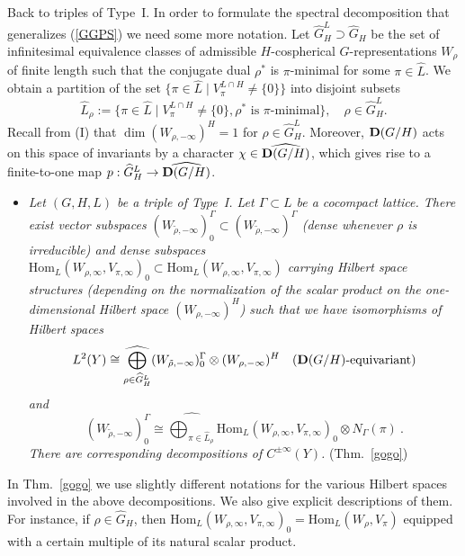 \documentclass[10]{amsart}
\theoremstyle{remark}
\theoremstyle{definition}
\numberwithin{equation}{section}
\newcommand{\Hom}{\mathrm{Hom}}
\begin{document}
Back to triples of Type~I. In order to formulate the spectral decomposition that generalizes (\ref{GGPS}) we need some more notation. Let $\widehat G_H^L\supset \widehat G_H$
be the set of infinitesimal equivalence classes of admissible $H$-cospherical $G$-representations $W_\rho$ of finite length such that the conjugate dual $\rho^*$ is $\pi$-minimal
for some $\pi\in\widehat L$. We obtain a partition of the set $\{\pi\in\widehat L\mid V_\pi^{L\cap H}\ne\{0\}\}$ into disjoint subsets
$$ \widehat L_\rho:=\{  \pi\in\widehat L\mid V_\pi^{L\cap H}\ne\{0\}, \rho^*\mbox{ is }\pi\mbox{-minimal}\},\quad \rho\in \widehat G_H^L.$$
Recall from (I) that $\dim (W_{\rho,-\infty})^H=1$ for $\rho\in \widehat G_H^L$. Moreover, ${\bf D}(G/H)$  acts on this space of invariants by a character $\chi\in \widehat{{\bf D}(G/H)}$, which gives rise to a finite-to-one map $p: \widehat G_H^L\rightarrow \widehat{{\bf D}(G/H)}$.
\begin{itemize}
\item[({\bf K})] {\em Let $(G,H,L)$ be a triple of Type~I. Let $\Gamma\subset L$ be a cocompact lattice. There exist vector subspaces $(W_{\widetilde{\rho},-\infty})^\Gamma_0\subset (W_{\widetilde{\rho},-\infty})^\Gamma$ (dense whenever $\rho$ is irreducible) and dense subspaces $\Hom_L(W_{\rho,\infty},V_{\pi,\infty})_0\subset \Hom_L(W_{\rho,\infty},V_{\pi,\infty})$ carrying
Hilbert space structures (depending on the normalization of the scalar product on the one-dimensional Hilbert space $(W_{\rho,-\infty})^H$) such that we have isomorphisms of Hilbert spaces 
$$  L^2(Y)\cong \widehat{\bigoplus_{\rho\in\widehat G_H^L}} (W_{\tilde \rho,-\infty})_0^\Gamma\otimes  (W_{\rho,-\infty})^H\quad ({\bf D}(G/H)\mbox{-equivariant})$$
and 
$$  (W_{\widetilde{\rho},-\infty})^\Gamma_0\cong  \widehat{\bigoplus_{\pi\in\widehat L_\rho}} \Hom_L(W_{\rho,\infty},V_{\pi,\infty})_0\otimes N_\Gamma(\pi)\ .$$
There are corresponding decompositions of $C^{\pm\infty}(Y)$.}
(Thm.~\ref{gogo})
\end{itemize}
In Thm.~\ref{gogo} we use slightly different notations for the various Hilbert spaces involved in the above decompositions. We also give explicit descriptions of them.
For instance, if $\rho\in\widehat G_H$, then $\Hom_L(W_{\rho,\infty},V_{\pi,\infty})_0=\Hom_L(W_{\rho},V_{\pi})$ equipped with a certain multiple of its natural scalar product.
\end{document}
